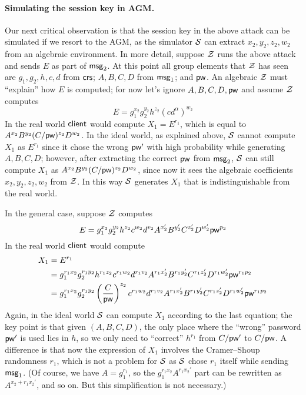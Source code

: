 \paragraph{Simulating the session key in AGM.}

Our next critical observation is that the session key in the above attack can be simulated if we resort to the AGM, as the simulator $\mathcal{S}$ can extract $x_2, y_2, z_2, w_2$ from an algebraic environment. In more detail, suppose $\mathcal{Z}$ runs the above attack and sends $E$ as part of $\mathsf{msg}_{2}$. At this point all group elements that $\mathcal{Z}$ has seen are $g_1,g_2,h,c,d$ from $\mathsf{crs}$; $A,B,C,D$ from $\mathsf{msg}_{1}$; and $\mathsf{pw}$. An algebraic $\mathcal{Z}$ must ``explain'' how $E$ is computed; for now let's ignore $A,B,C,D,\mathsf{pw}$ and assume $\mathcal{Z}$ computes
\[
E = g_1^{x_2}g_2^{y_2}h^{z_2}(cd^\alpha)^{w_2}
\]
In the real world $\mathsf{client}$ would compute $X_1 = E^{r_1}$, which is equal to $A^{x_2}B^{y_2}(C/\mathsf{pw})^{z_2}D^{w_2}$. In the ideal world, as explained above, $\mathcal{S}$ cannot compute $X_1$ as $E^{r_1}$ since it chose the wrong $\mathsf{pw}'$ with high probability while generating $A,B,C,D$; however, after extracting the correct $\mathsf{pw}$ from $\mathsf{msg}_{2}$, $\mathcal{S}$ can still compute $X_1$ as $A^{x_2}B^{y_2}(C/\mathsf{pw})^{z_2}D^{w_2}$, since now it sees the algebraic coefficients $x_2,y_2,z_2,w_2$ from $\mathcal{Z}$. In this way $\mathcal{S}$ generates $X_1$ that is indistinguishable from the real world.

In the general case, suppose $\mathcal{Z}$ computes
\[
E = g_1^{x_2}g_2^{y_2}h^{z_2}c^{w_2}d^{v_2}A^{x_2'}B^{y_2'}C^{z_2'}D^{w_2'}\mathsf{pw}^{p_2}
\]
In the real world $\mathsf{client}$ would compute
\begin{align*}
	X_1 &= E^{r_1} \\
	&= g_1^{r_1x_2} g_2^{r_1y_2} h^{r_1z_2} c^{r_1w_2} d^{r_1v_2} A^{r_1x_2'} B^{r_1y_2'} C^{r_1z_2'} D^{r_1w_2'} \mathsf{pw}^{r_1p_2} \\
	&= g_1^{r_1x_2} g_2^{r_1y_2} \left(\frac{C}{\mathsf{pw}}\right)^{z_2} c^{r_1w_2} d^{r_1v_2} A^{r_1x_2'} B^{r_1y_2'} C^{r_1z_2'} D^{r_1w_2'} \mathsf{pw}^{r_1p_2}
\end{align*}	
Again, in the ideal world $\mathcal{S}$ can compute $X_1$ according to the last equation; the key point is that given $(A,B,C,D)$, the only place where the ``wrong'' password $\mathsf{pw}'$ is used lies in $h$, so we only need to ``correct'' $h^{r_1}$ from $C/\mathsf{pw}'$ to $C/\mathsf{pw}$. A difference is that now the expression of $X_1$ involves the Cramer--Shoup randomness $r_1$, which is not a problem for $\mathcal{S}$ as $\mathcal{S}$ chose $r_1$ itself while sending $\mathsf{msg}_{1}$. (Of course, we have $A = g_1^{r_1}$, so the $g_1^{r_1x_2} A^{r_1x_2'}$ part can be rewritten as $A^{x_2+r_1x_2'}$, and so on. But this simplification is not necessary.)

